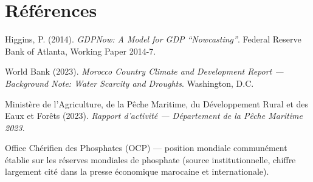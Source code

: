 \documentclass[11pt,a4paper]{article}
\begin{document}
\section*{Références}
\begin{enumerate}[leftmargin=1.6em, label=\textbf{[\arabic*]}]
\item \hypertarget{ref1}{} Higgins, P. (2014). \textit{GDPNow: A Model for GDP ``Nowcasting''}. Federal Reserve Bank of Atlanta, Working Paper 2014-7.
\item \hypertarget{ref2}{} World Bank (2023). \textit{Morocco Country Climate and Development Report --- Background Note: Water Scarcity and Droughts}. Washington, D.C.
\item \hypertarget{ref3}{} Ministère de l'Agriculture, de la Pêche Maritime, du Développement Rural et des Eaux et Forêts (2023). \textit{Rapport d'activité --- Département de la Pêche Maritime 2023}.
\item \hypertarget{ref4}{} Office Chérifien des Phosphates (OCP) --- position mondiale communément établie sur les réserves mondiales de phosphate (source institutionnelle, chiffre largement cité dans la presse économique marocaine et internationale).
\end{enumerate}
\end{document}
